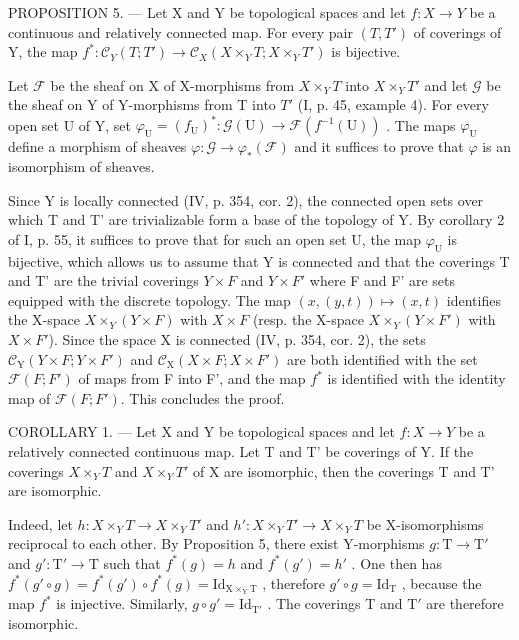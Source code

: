 PROPOSITION 5. --- Let X and Y be topological spaces and let \(f: X \to Y\) be a continuous and relatively connected map. For every pair \((T, T')\) of coverings of Y, the map \(f^{*}: \mathcal{C}_{Y}(T; T') \to \mathcal{C}_{X}(X \times_{Y} T; X \times_{Y} T')\) is bijective.

Let \(\mathcal{F}\) be the sheaf on X of X-morphisms from \(X \times_{Y} T\) into \(X \times_{Y} T'\) and let \(\mathcal{G}\) be the sheaf on Y of Y-morphisms from T into \(T'\) (I, p. 45, example 4). For every open set U of Y, set \(\varphi_{\mathrm{U}} = (f_{\mathrm{U}})^{*}: \mathcal{G}(\mathrm{U}) \to \mathcal{F}(f^{-1}(\mathrm{U}))\) . The maps \(\varphi_{\mathrm{U}}\) define a morphism of sheaves \(\varphi: \mathcal{G} \to \varphi_{*}(\mathcal{F})\) and it suffices to prove that \(\varphi\) is an isomorphism of sheaves.

Since Y is locally connected (IV, p. 354, cor. 2), the connected open sets over which T and T' are trivializable form a base of the topology of Y. By corollary 2 of I, p. 55, it suffices to prove that for such an open set U, the map \(\varphi_{\mathrm{U}}\) is bijective, which allows us to assume that Y is connected and that the coverings T and T' are the trivial coverings \(Y \times F\) and \(Y \times F'\) where F and F' are sets equipped with the discrete topology. The map \((x, (y, t)) \mapsto (x, t)\) identifies the X-space \(X \times_{Y} (Y \times F)\) with \(X \times F\) (resp. the X-space \(X \times_{Y} (Y \times F')\) with \(X \times F'\)). Since the space X is connected (IV, p. 354, cor. 2), the sets \(\mathcal{C}_{\mathrm{Y}}(Y \times F; Y \times F')\) and \(\mathcal{C}_{\mathrm{X}}(X \times F; X \times F')\) are both identified with the set \(\mathcal{F}(F;F')\) of maps from F into F', and the map \(f^{*}\) is identified with the identity map of \(\mathcal{F}(F;F')\). This concludes the proof.

COROLLARY 1. --- Let X and Y be topological spaces and let \(f: X \to Y\) be a relatively connected continuous map. Let T and T' be coverings of Y. If the coverings \(X \times_Y T\) and \(X \times_Y T'\) of X are isomorphic, then the coverings T and T' are isomorphic.

Indeed, let \(h \colon X \times_{Y} T \to X \times_{Y} T'\) and \(h' \colon X \times_{Y} T' \to X \times_{Y} T\) be X-isomorphisms reciprocal to each other. By Proposition 5, there exist Y-morphisms \(g \colon \mathrm{T} \to \mathrm{T}'\) and \(g' \colon \mathrm{T}' \to \mathrm{T}\) such that \(f^{*}(g) = h\) and \(f^{*}(g') = h'\) . One then has \(f^{*}(g' \circ g) = f^{*}(g') \circ f^{*}(g) = \mathrm{Id}_{\mathrm{X} \times_{\mathrm{Y}} \mathrm{T}}\) , therefore \(g' \circ g = \mathrm{Id}_{\mathrm{T}}\) , because the map \(f^{*}\) is injective. Similarly, \(g \circ g' = \mathrm{Id}_{\mathrm{T}'}\) . The coverings T and \(\mathrm{T}'\) are therefore isomorphic.

